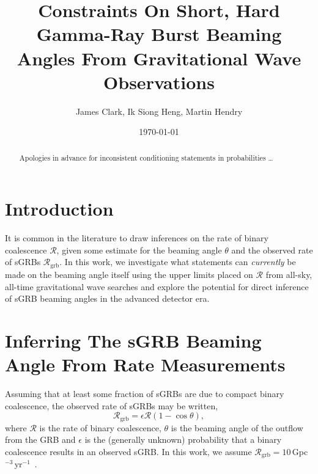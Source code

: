 \documentclass[nofootinbib]{revtex4}
\newcommand{\gw}{gravitational wave }
\newcommand{\grbrate}{{{\mathcal R}_{\mathrm{grb}}}}
\newcommand{\cbcrate}{{{\mathcal R}}}
\begin{document}
\title{Constraints On Short, Hard Gamma-Ray Burst Beaming Angles From
Gravitational Wave Observations}
\author{James Clark, Ik Siong Heng, Martin Hendry}
\date{\today}

\begin{abstract}
Apologies in advance for inconsistent conditioning statements in probabilities
\dots
\end{abstract}

\maketitle

\tableofcontents

\section{Introduction}

It is common in the literature to draw inferences on the rate of binary
coalescence $\cbcrate$, given some estimate for the beaming angle $\theta$ and
the observed rate of sGRBs $\grbrate$.  In this work, we investigate what
statements can \emph{currently} be made on the beaming angle itself using the
upper limits placed on $\cbcrate$ from all-sky, all-time \gw searches and
explore the potential for direct inference of sGRB  beaming angles in the
advanced detector era.

\section{Inferring The sGRB Beaming Angle From Rate Measurements}
Assuming that at least some fraction of sGRBs are due to compact binary
coalescence, the observed rate of sGRBs may be written,
%
\begin{equation}\label{eq:rate2angle}
\grbrate=\epsilon\cbcrate(1-\cos \theta),
\end{equation}
%
where $\cbcrate$ is the rate of binary coalescence, $\theta$ is the beaming
angle of the outflow from the GRB and $\epsilon$ is the (generally unknown)
probability that a binary coalescence results in an observed sGRB.  In this
work, we assume
$\grbrate=10$\,Gpc$^{-3}$\,yr$^{-1}$~\cite{nakar-2007,Dietz11}.
 
\end{document}

